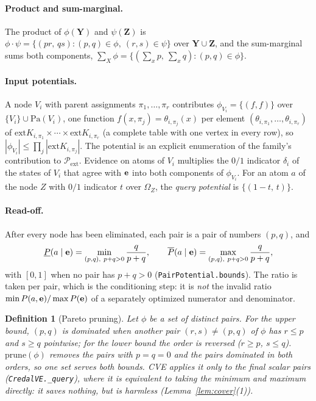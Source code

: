 \documentclass{article} %
\newtheorem{definition}{Definition}
\newcommand{\ext}{\mathrm{ext}}
\newcommand{\prune}{\mathrm{prune}}
\providecommand{\Pa}{\mathrm{Pa}}
\begin{document}
\paragraph{Product and sum-marginal.}
The product of $\phi(\mathbf{Y})$ and $\psi(\mathbf{Z})$ is
$\phi \cdot \psi = \{(p r,\, q s) : (p,q) \in \phi,\ (r,s) \in \psi\}$ over
$\mathbf{Y}\cup\mathbf{Z}$, and the sum-marginal sums both components,
$\sum_{X}\phi = \{(\sum_x p,\ \sum_x q) : (p,q)\in\phi\}$.

\paragraph{Input potentials.}
A node $V_i$ with parent assignments $\pi_1,\dots,\pi_r$ contributes
$\phi_{V_i}=\{(f,f)\}$ over $\{V_i\}\cup\Pa(V_i)$, one function $f(x,\pi_j)=\theta_{i,\pi_j}(x)$
per element $(\theta_{i,\pi_1},\dots,\theta_{i,\pi_r})$ of
$\ext K_{i,\pi_1}\times\cdots\times\ext K_{i,\pi_r}$ (a complete table with one vertex in
every row), so $|\phi_{V_i}|\le\prod_j|\ext K_{i,\pi_j}|$. The potential is an explicit
enumeration of the family's contribution to $\mathcal P_{\mathrm{ext}}$. Evidence on atoms of
$V_i$ multiplies the $0/1$ indicator $\delta_i$ of the states of $V_i$ that agree with
$\mathbf{e}$ into both components of $\phi_{V_i}$. For an atom $a$ of the node $Z$ with $0/1$
indicator $t$ over $\Omega_Z$, the \emph{query potential} is $\{(1-t,\,t)\}$.

\paragraph{Read-off.}
After every node has been eliminated, each pair is a pair of numbers $(p,q)$, and
\[
  \underline{P}(a\mid\be)=\min_{(p,q),\ p+q>0}\frac{q}{p+q},\qquad
  \overline{P}(a\mid\be)=\max_{(p,q),\ p+q>0}\frac{q}{p+q},
\]
with $[0,1]$ when no pair has $p+q>0$ (\texttt{PairPotential.bounds}). The ratio is
taken per pair, which is the conditioning step: it is \emph{not} the invalid ratio
$\min P(a,\mathbf{e})/\max P(\mathbf{e})$ of a separately optimized numerator and denominator.

\begin{definition}[Pareto pruning]\label{def:prune}
Let $\phi$ be a set of distinct pairs. For the upper bound, $(p,q)$ is
\emph{dominated} when another pair $(r,s)\neq(p,q)$ of $\phi$ has $r\le p$ and $s\ge q$
pointwise; for the lower bound the order is reversed ($r\ge p$, $s\le q$).
$\prune(\phi)$ removes the pairs with $p=q=0$ and the pairs dominated in \emph{both}
orders, so one set serves both bounds. CVE applies it only to the final scalar pairs
(\texttt{CredalVE.\_query}), where it is equivalent to taking the minimum and maximum
directly: it saves nothing, but is harmless (Lemma~\ref{lem:cover}(1)).
\end{definition}
\end{document}
